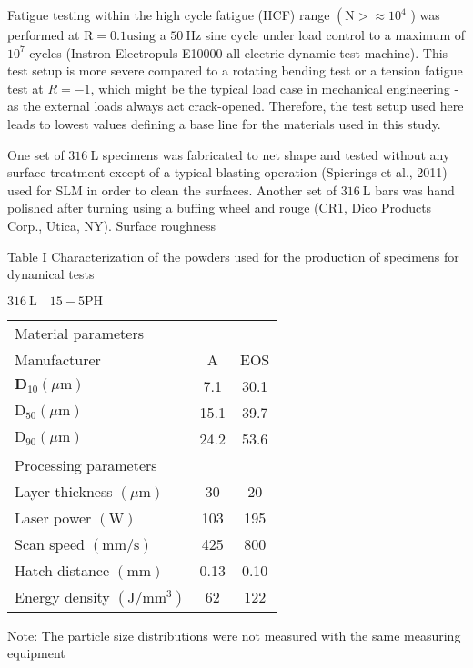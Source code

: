 \documentclass[10pt]{article}
\begin{document}
Fatigue testing within the high cycle fatigue (HCF) range $\left(\mathrm{N}>\approx 10^{4}\right.$ ) was performed at $\mathrm{R}=0.1 \mathrm{using}$ a $50 \mathrm{~Hz}$ sine cycle under load control to a maximum of $10^{7}$ cycles (Instron Electropuls E10000 all-electric dynamic test machine). This test setup is more severe compared to a rotating bending test or a tension fatigue test at $R=-1$, which might be the typical load case in mechanical engineering - as the external loads always act crack-opened. Therefore, the test setup used here leads to lowest values defining a base line for the materials used in this study.

One set of $316 \mathrm{~L}$ specimens was fabricated to net shape and tested without any surface treatment except of a typical blasting operation (Spierings et al., 2011) used for SLM in order to clean the surfaces. Another set of $316 \mathrm{~L}$ bars was hand polished after turning using a buffing wheel and rouge (CR1, Dico Products Corp., Utica, NY). Surface roughness

Table I Characterization of the powders used for the production of specimens for dynamical tests

$316 \mathrm{~L} \quad 15-5 \mathrm{PH}$

\begin{center}
\begin{tabular}{lcc}
\hline
Material parameters &  &  \\
Manufacturer & A & EOS \\
$\mathbf{D}_{10}(\mu \mathrm{m})$ & 7.1 & 30.1 \\
$\mathrm{D}_{50}(\mu \mathrm{m})$ & 15.1 & 39.7 \\
$\mathrm{D}_{90}(\mu \mathrm{m})$ & 24.2 & 53.6 \\
Processing parameters &  &  \\
Layer thickness $(\mu \mathrm{m})$ & 30 & 20 \\
Laser power $(\mathrm{W})$ & 103 & 195 \\
Scan speed $(\mathrm{mm} / \mathrm{s})$ & 425 & 800 \\
Hatch distance $(\mathrm{mm})$ & 0.13 & 0.10 \\
Energy density $\left(\mathrm{J} / \mathrm{mm}^{3}\right)$ & 62 & 122 \\
\end{tabular}
\end{center}

Note: The particle size distributions were not measured with the same measuring equipment
\end{document}

